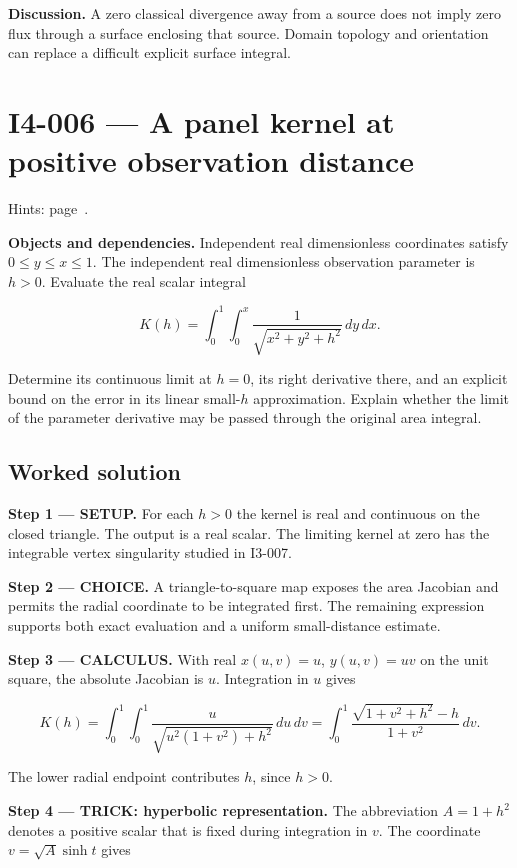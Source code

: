 \documentclass[11pt,oneside,openany]{book}
\begin{document}
\textbf{Discussion.} A zero classical divergence away from a source does not imply zero flux through a surface enclosing that source. Domain topology and orientation can replace a difficult explicit surface integral.
\clearpage
\section{I4-006 --- A panel kernel at positive observation distance}
\label{problem:I4-006}
{\small Hints: page~\pageref{hints:I4-006}.}\par\medskip

\textbf{Objects and dependencies.} Independent real dimensionless coordinates satisfy \(0\le y\le x\le1\). The independent real dimensionless observation parameter is \(h>0\). Evaluate the real scalar integral

\[
K(h)=\int_0^1\int_0^x\frac{1}{\sqrt{x^2+y^2+h^2}}\,dy\,dx.
\]

Determine its continuous limit at \(h=0\), its right derivative there, and an explicit bound on the error in its linear small-\(h\) approximation. Explain whether the limit of the parameter derivative may be passed through the original area integral.
\subsection*{Worked solution}

\textbf{Step 1 --- SETUP.} For each \(h>0\) the kernel is real and continuous on the closed triangle. The output is a real scalar. The limiting kernel at zero has the integrable vertex singularity studied in I3-007.

\begin{ChoiceStep}
\textbf{Step 2 --- CHOICE.} A triangle-to-square map exposes the area Jacobian and permits the radial coordinate to be integrated first. The remaining expression supports both exact evaluation and a uniform small-distance estimate.

\end{ChoiceStep}
\textbf{Step 3 --- CALCULUS.} With real \(x(u,v)=u\), \(y(u,v)=uv\) on the unit square, the absolute Jacobian is \(u\). Integration in \(u\) gives

\[
K(h)=\int_0^1\int_0^1\frac{u}{\sqrt{u^2(1+v^2)+h^2}}\,du\,dv
=\int_0^1\frac{\sqrt{1+v^2+h^2}-h}{1+v^2}\,dv.
\]

The lower radial endpoint contributes \(h\), since \(h>0\).

\begingroup\color{TrickPurple}
\textbf{Step 4 --- TRICK: hyperbolic representation.} The abbreviation \(A=1+h^2\) denotes a positive scalar that is fixed during integration in \(v\). The coordinate \(v=\sqrt A\sinh t\) gives
\end{document}
